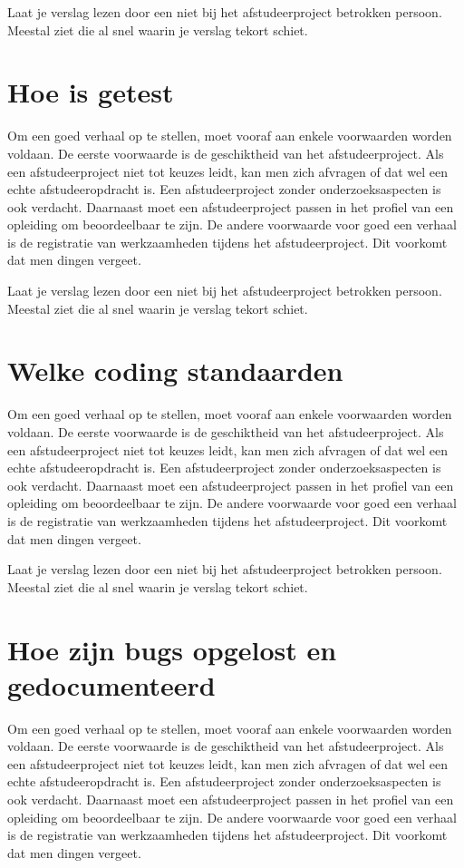 		
		Laat je verslag lezen door een niet bij het afstudeerproject betrokken
		persoon. Meestal ziet die al snel waarin je verslag tekort schiet.
		\section{Hoe is getest}
		Om een goed verhaal op te stellen, moet vooraf aan enkele voorwaarden
		worden voldaan. De eerste voorwaarde is de geschiktheid van het
		afstudeerproject. Als een afstudeerproject niet tot keuzes leidt, kan
		men zich afvragen of dat wel een echte afstudeeropdracht is. Een
		afstudeerproject zonder onderzoeksaspecten is ook verdacht. Daarnaast
		moet een afstudeerproject passen in het profiel van een opleiding om
		beoordeelbaar te zijn. De andere voorwaarde voor goed een verhaal is
		de registratie van werkzaamheden tijdens het afstudeerproject. Dit
		voorkomt dat men dingen vergeet.
		
		
		Laat je verslag lezen door een niet bij het afstudeerproject betrokken
		persoon. Meestal ziet die al snel waarin je verslag tekort schiet.
		\section{Welke coding standaarden}
		Om een goed verhaal op te stellen, moet vooraf aan enkele voorwaarden
		worden voldaan. De eerste voorwaarde is de geschiktheid van het
		afstudeerproject. Als een afstudeerproject niet tot keuzes leidt, kan
		men zich afvragen of dat wel een echte afstudeeropdracht is. Een
		afstudeerproject zonder onderzoeksaspecten is ook verdacht. Daarnaast
		moet een afstudeerproject passen in het profiel van een opleiding om
		beoordeelbaar te zijn. De andere voorwaarde voor goed een verhaal is
		de registratie van werkzaamheden tijdens het afstudeerproject. Dit
		voorkomt dat men dingen vergeet.
		
		
		Laat je verslag lezen door een niet bij het afstudeerproject betrokken
		persoon. Meestal ziet die al snel waarin je verslag tekort schiet.
		\section{Hoe zijn bugs opgelost en gedocumenteerd}
		Om een goed verhaal op te stellen, moet vooraf aan enkele voorwaarden
		worden voldaan. De eerste voorwaarde is de geschiktheid van het
		afstudeerproject. Als een afstudeerproject niet tot keuzes leidt, kan
		men zich afvragen of dat wel een echte afstudeeropdracht is. Een
		afstudeerproject zonder onderzoeksaspecten is ook verdacht. Daarnaast
		moet een afstudeerproject passen in het profiel van een opleiding om
		beoordeelbaar te zijn. De andere voorwaarde voor goed een verhaal is
		de registratie van werkzaamheden tijdens het afstudeerproject. Dit
		voorkomt dat men dingen vergeet.
		
